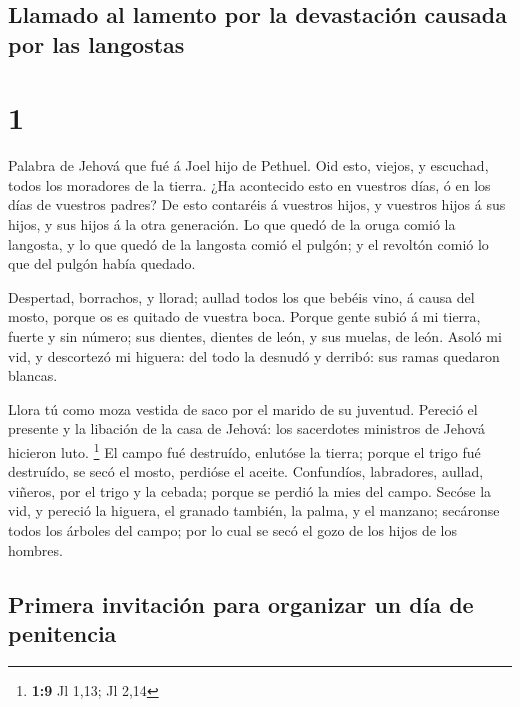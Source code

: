 \hypertarget{llamado-al-lamento-por-la-devastaciuxf3n-causada-por-las-langostas}{%
\subsection{Llamado al lamento por la devastación causada por las
langostas}\label{llamado-al-lamento-por-la-devastaciuxf3n-causada-por-las-langostas}}

\hypertarget{section}{%
\section{1}\label{section}}

 Palabra de Jehová que fué á Joel hijo de Pethuel.
 Oid esto, viejos, y escuchad, todos los moradores de la
tierra. ¿Ha acontecido esto en vuestros días, ó en los días de vuestros
padres?  De esto contaréis á vuestros hijos, y vuestros
hijos á sus hijos, y sus hijos á la otra generación.  Lo
que quedó de la oruga comió la langosta, y lo que quedó de la langosta
comió el pulgón; y el revoltón comió lo que del pulgón había quedado.

 Despertad, borrachos, y llorad; aullad todos los que
bebéis vino, á causa del mosto, porque os es quitado de vuestra boca.
 Porque gente subió á mi tierra, fuerte y sin número; sus
dientes, dientes de león, y sus muelas, de león.  Asoló mi
vid, y descortezó mi higuera: del todo la desnudó y derribó: sus ramas
quedaron blancas.

 Llora tú como moza vestida de saco por el marido de su
juventud.  Pereció el presente y la libación de la casa de
Jehová: los sacerdotes ministros de Jehová hicieron luto. \footnote{\textbf{1:9}
  Jl 1,13; Jl 2,14}  El campo fué destruído, enlutóse la
tierra; porque el trigo fué destruído, se secó el mosto, perdióse el
aceite.  Confundíos, labradores, aullad, viñeros, por el
trigo y la cebada; porque se perdió la mies del campo. 
Secóse la vid, y pereció la higuera, el granado también, la palma, y el
manzano; secáronse todos los árboles del campo; por lo cual se secó el
gozo de los hijos de los hombres.

\hypertarget{primera-invitaciuxf3n-para-organizar-un-duxeda-de-penitencia}{%
\subsection{Primera invitación para organizar un día de
penitencia}\label{primera-invitaciuxf3n-para-organizar-un-duxeda-de-penitencia}}

